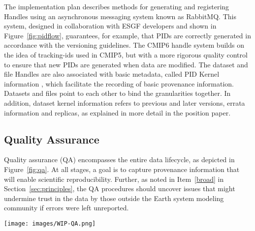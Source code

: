 \documentclass[gmd,manuscript]{copernicus}
\begin{document}
The implementation plan describes methods for generating and
registering Handles using an asynchronous messaging system known as
RabbitMQ. This system, designed in collaboration with ESGF developers
and shown in Figure~\ref{fig:pidflow}, guarantees, for example, that
PIDs are correctly generated in accordance with the versioning
guidelines. The CMIP6 handle system builds on the idea of tracking-ids
used in CMIP5, but with a more rigorous quality control to ensure that
new PIDs are generated when data are modified. The dataset and file
Handles are also associated with basic metadata, called PID Kernel
information \citep{ref:zhouetal2018}, which facilitate the recording
of basic provenance information. Datasets and files point to each
other to bind the granularities together. In addition, dataset kernel
information refers to previous and later versions, errata information
and replicas, as explained in more detail in the position paper.

\subsection{Quality Assurance}
\label{sec:qa}

Quality assurance (QA) encompasses the entire data lifecycle, as
depicted in Figure~\ref{fig:qa}. At all stages, a goal is to capture
provenance information that will enable scientific reproducibility.
Further, as noted in Item~\ref{broad} in Section~\ref{sec:principles},
the QA procedures should uncover issues that might undermine trust in
the data by those outside the Earth system modeling community if
errors were left unreported.

\begin{figure*}
  \begin{center}
    \texttt{[image: images/WIP-QA.png]}
  \end{center}
  \caption{Schematic of the phases of quality assurance, with earlier
    stages in the hands of modeling centers (left), and more formal
    long-term data curation stages at right. Quality assurance is
    applied both to the data (D, above) as well as the metadata (M)
    describing the data. Figure drawn from the WIP's Quality Assurance
    position paper.}
  \label{fig:qa}
\end{figure*}
\end{document}
